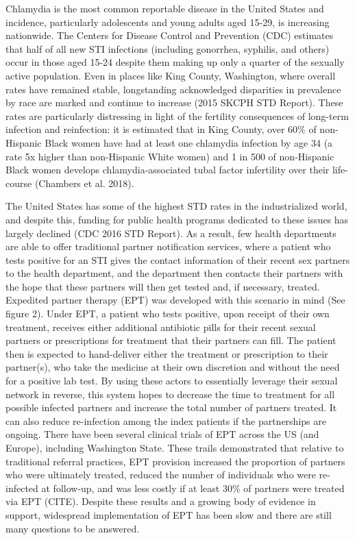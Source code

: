 \documentclass [11pt, proquest] {uwthesis}[2015/03/03]
\begin{document}
Chlamydia is the most common reportable disease in the United States and
incidence, particularly adolescents and young adults aged 15-29, is
increasing nationwide. The Centers for Disease Control and Prevention
(CDC) estimates that half of all new STI infections (including
gonorrhea, syphilis, and others) occur in those aged 15-24 despite them
making up only a quarter of the sexually active population. Even in
places like King County, Washington, where overall rates have remained
stable, longstanding acknowledged disparities in prevalence by race are
marked and continue to increase (2015 SKCPH STD Report). These rates are
particularly distressing in light of the fertility consequences of
long-term infection and reinfection: it is estimated that in King
County, over 60\% of non-Hispanic Black women have had at least one
chlamydia infection by age 34 (a rate 5x higher than non-Hispanic White
women) and 1 in 500 of non-Hispanic Black women develops
chlamydia-associated tubal factor infertility over their life-course
(Chambers et al. 2018).

The United States has some of the highest STD rates in the
industrialized world, and despite this, funding for public health
programs dedicated to these issues has largely declined (CDC 2016 STD
Report). As a result, few health departments are able to offer
traditional partner notification services, where a patient who tests
positive for an STI gives the contact information of their recent sex
partners to the health department, and the department then contacts
their partners with the hope that these partners will then get tested
and, if necessary, treated. Expedited partner therapy (EPT) was
developed with this scenario in mind (See figure 2). Under EPT, a
patient who tests positive, upon receipt of their own treatment,
receives either additional antibiotic pills for their recent sexual
partners or prescriptions for treatment that their partners can fill.
The patient then is expected to hand-deliver either the treatment or
prescription to their partner(s), who take the medicine at their own
discretion and without the need for a positive lab test. By using these
actors to essentially leverage their sexual network in reverse, this
system hopes to decrease the time to treatment for all possible infected
partners and increase the total number of partners treated. It can also
reduce re-infection among the index patients if the partnerships are
ongoing. There have been several clinical trials of EPT across the US
(and Europe), including Washington State. These trails demonstrated that
relative to traditional referral practices, EPT provision increased the
proportion of partners who were ultimately treated, reduced the number
of individuals who were re-infected at follow-up, and was less costly if
at least 30\% of partners were treated via EPT (CITE). Despite these
results and a growing body of evidence in support, widespread
implementation of EPT has been slow and there are still many questions
to be answered.
\end{document}
